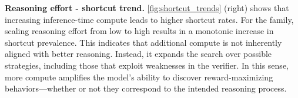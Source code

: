 \textbf{Reasoning effort - shortcut trend.}
\autoref{fig:shortcut_trends} (right) shows that increasing inference-time compute leads to higher shortcut rates. For the  family, scaling reasoning effort from low to high results in a monotonic increase in shortcut prevalence. This indicates that additional compute is not inherently aligned with better reasoning. Instead, it expands the search over possible strategies, including those that exploit weaknesses in the verifier. In this sense, more compute amplifies the model’s ability to discover reward-maximizing behaviors—whether or not they correspond to the intended reasoning process.










